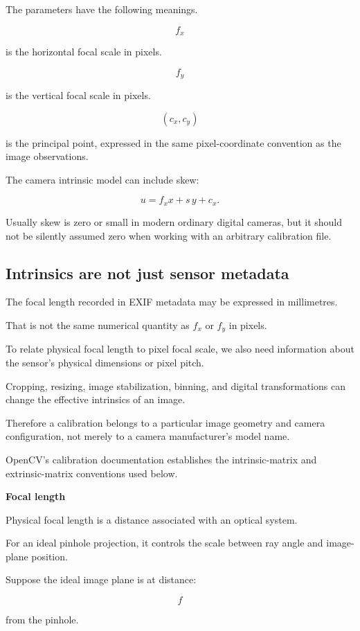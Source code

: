 The parameters have the following meanings.

\[
 f_x
\]

is the horizontal focal scale in pixels.

\[
 f_y
\]

is the vertical focal scale in pixels.

\[
 (c_x,c_y)
\]

is the principal point, expressed in the same pixel-coordinate convention as the image observations.

The camera intrinsic model can include skew:

\[
 \boxed{ u=f_xx+s\,y+c_x }.
\]

Usually skew is zero or small in modern ordinary digital cameras, but it should not be silently assumed zero when working with an arbitrary calibration file.

\subsection{Intrinsics are not just sensor metadata}\label{02-foundations-ii-ch034-intrinsics-are-not-just-sensor-metadata}

The focal length recorded in EXIF metadata may be expressed in millimetres.

That is not the same numerical quantity as \(f_x\) or \(f_y\) in pixels.

To relate physical focal length to pixel focal scale, we also need information about the sensor's physical dimensions or pixel pitch.

Cropping, resizing, image stabilization, binning, and digital transformations can change the effective intrinsics of an image.

Therefore a calibration belongs to a particular image geometry and camera configuration, not merely to a camera manufacturer's model name.

OpenCV's calibration documentation establishes the intrinsic-matrix and extrinsic-matrix conventions used below. 

\textbf{Focal length}

Physical focal length is a distance associated with an optical system.

For an ideal pinhole projection, it controls the scale between ray angle and image-plane position.

Suppose the ideal image plane is at distance:

\[
 f
\]

from the pinhole.

